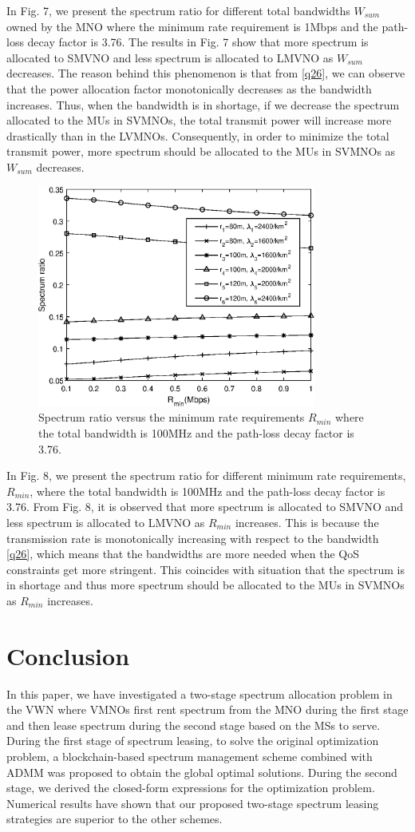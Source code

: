 \documentclass[journal]{IEEEtran}
\begin{document}
In Fig. 7, we present the spectrum ratio for different total bandwidths $W_{sum}$ owned by the MNO where the minimum rate requirement is 1Mbps and the path-loss decay factor is 3.76. The results in Fig. 7 show that more spectrum is allocated to SMVNO and less spectrum is allocated to LMVNO as $W_{sum}$ decreases. The reason behind this phenomenon is that from \eqref{q26}, we can observe that the power allocation factor monotonically decreases as the bandwidth increases. Thus, when the bandwidth is in shortage, if we decrease the spectrum allocated to the MUs in SVMNOs, the total transmit power will increase more drastically than in the LVMNOs. Consequently, in order to minimize the total transmit power, more spectrum should be allocated to the MUs in SVMNOs as $W_{sum}$ decreases.

\begin{figure}
	\centering
	\includegraphics[width=3.6in]{SR_rmin.eps}
	\caption{Spectrum ratio versus the minimum rate requirements $R_{min}$ where the total bandwidth is 100MHz and the path-loss decay factor is 3.76.}
\end{figure}

In Fig. 8, we present the spectrum ratio for different minimum rate requirements, $R_{min}$, where the total bandwidth is 100MHz and the path-loss decay factor is 3.76. From Fig. 8, it is observed that more spectrum is allocated to SMVNO and less spectrum is allocated to LMVNO as $R_{min}$ increases. This is because the transmission rate is monotonically increasing with respect to the bandwidth \eqref{q26}, which means that the bandwidths are more needed when the QoS constraints get more stringent. This coincides with situation that the spectrum is in shortage and thus more spectrum should be allocated to the MUs in SVMNOs as $R_{min}$ increases.
\section{Conclusion}
In this paper, we have investigated a two-stage spectrum allocation problem in the VWN where VMNOs first rent spectrum from the MNO during the first stage and then lease spectrum during the second stage based on the MSs to serve. During the first stage of spectrum leasing, to solve the original optimization problem, a blockchain-based spectrum management scheme combined with ADMM was proposed to obtain the global optimal solutions. During the second stage, we derived the closed-form expressions for the optimization problem. Numerical results have shown that our proposed two-stage spectrum leasing strategies are superior to the other schemes.
\appendices
\end{document}
